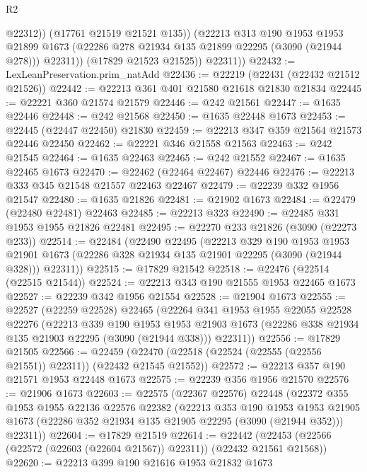 \begin{lexlean}{R2}
\begin{coremodule}
                  @22312))
              (@17761 @21519 @21521 @135))
            (@22213
              @313
              @190
              @1953
              @1953
              @21899
              @1673
              (@22286 @278 @21934 @135 @21899 @22295 (@3090 (@21944 @278)))
              @22311))
          (@17829 @21523 @21525))
        @22311))
@22432 := LexLeanPreservation.prim_natAdd
@22436 := @22219 (@22431 (@22432 @21512 @21526))
@22442 := @22213 @361 @401 @21580 @21618 @21830 @21834
@22445 := @22221 @360 @21574 @21579
@22446 := @242 @21561
@22447 := @1635 @22446
@22448 := @242 @21568
@22450 := @1635 @22448 @1673
@22453 := @22445 (@22447 @22450) @21830
@22459 := @22213 @347 @359 @21564 @21573 @22446 @22450
@22462 := @22221 @346 @21558 @21563
@22463 := @242 @21545
@22464 := @1635 @22463
@22465 := @242 @21552
@22467 := @1635 @22465 @1673
@22470 := @22462 (@22464 @22467) @22446
@22476 := @22213 @333 @345 @21548 @21557 @22463 @22467
@22479 := @22239 @332 @1956 @21547
@22480 := @1635 @21826
@22481 := @21902 @1673
@22484 := @22479 (@22480 @22481) @22463
@22485 := @22213 @323
@22490 := @22485 @331 @1953 @1955 @21826 @22481
@22495 := @22270 @233 @21826 (@3090 (@22273 @233))
@22514 := @22484
    (@22490
      @22495
      (@22213
        @329
        @190
        @1953
        @1953
        @21901
        @1673
        (@22286 @328 @21934 @135 @21901 @22295 (@3090 (@21944 @328)))
        @22311))
@22515 := @17829 @21542
@22518 := @22476 (@22514 (@22515 @21544))
@22524 := @22213 @343 @190 @21555 @1953 @22465 @1673
@22527 := @22239 @342 @1956 @21554
@22528 := @21904 @1673
@22555 := @22527
    (@22259 @22528)
    @22465
    (@22264
      @341
      @1953
      @1955
      @22055
      @22528
      @22276
      (@22213
        @339
        @190
        @1953
        @1953
        @21903
        @1673
        (@22286 @338 @21934 @135 @21903 @22295 (@3090 (@21944 @338)))
        @22311))
@22556 := @17829 @21505
@22566 := @22459 (@22470 (@22518 (@22524 (@22555 (@22556 @21551)) @22311)) (@22432 @21545 @21552))
@22572 := @22213 @357 @190 @21571 @1953 @22448 @1673
@22575 := @22239 @356 @1956 @21570
@22576 := @21906 @1673
@22603 := @22575
    (@22367 @22576)
    @22448
    (@22372
      @355
      @1953
      @1955
      @22136
      @22576
      @22382
      (@22213
        @353
        @190
        @1953
        @1953
        @21905
        @1673
        (@22286 @352 @21934 @135 @21905 @22295 (@3090 (@21944 @352)))
        @22311))
@22604 := @17829 @21519
@22614 := @22442 (@22453 (@22566 (@22572 (@22603 (@22604 @21567)) @22311)) (@22432 @21561 @21568))
@22620 := @22213 @399 @190 @21616 @1953 @21832 @1673

\end{coremodule}
\end{lexlean}
